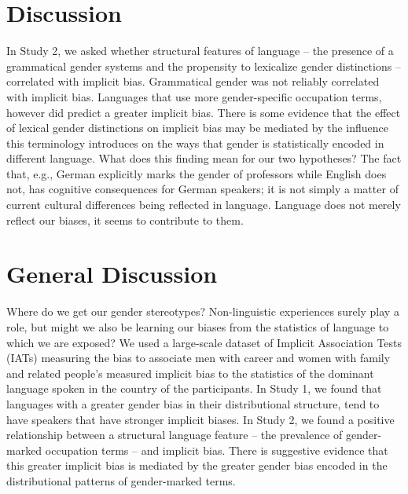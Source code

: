 \documentclass[man,floatsintext]{apa6}
\begin{document}
\hypertarget{discussion-1}{%
\section{Discussion}\label{discussion-1}}

In Study 2, we asked whether structural features of language -- the presence of a grammatical gender systems and the propensity to lexicalize gender distinctions -- correlated with implicit bias. Grammatical gender was not reliably correlated with implicit bias. Languages that use more gender-specific occupation terms, however did predict a greater implicit bias. There is some evidence that the effect of lexical gender distinctions on implicit bias may be mediated by the influence this terminology introduces on the ways that gender is statistically encoded in different language. What does this finding mean for our two hypotheses? The fact that, e.g., German explicitly marks the gender of professors while English does not, has cognitive consequences for German speakers; it is not simply a matter of current cultural differences being reflected in language. Language does not merely reflect our biases, it seems to contribute to them.

\hypertarget{general-discussion}{%
\section{General Discussion}\label{general-discussion}}

Where do we get our gender stereotypes? Non-linguistic experiences surely play a role, but might we also be learning our biases from the statistics of language to which we are exposed? We used a large-scale dataset of Implicit Association Tests (IATs) measuring the bias to associate men with career and women with family and related people's measured implicit bias to the statistics of the dominant language spoken in the country of the participants. In Study 1, we found that languages with a greater gender bias in their distributional structure, tend to have speakers that have stronger implicit biases. In Study 2, we found a positive relationship between a structural language feature -- the prevalence of gender-marked occupation terms -- and implicit bias. There is suggestive evidence that this greater implicit bias is mediated by the greater gender bias encoded in the distributional patterns of gender-marked terms.
\end{document}
